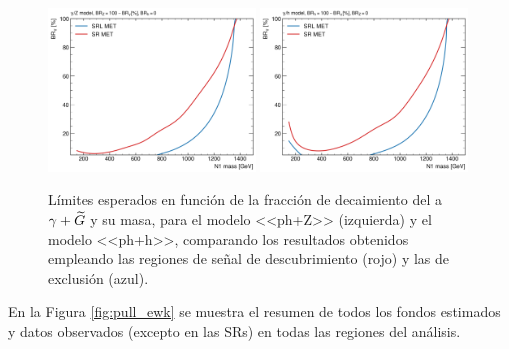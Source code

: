 \begin{figure}[ht!]
  \centering

    \includegraphics[width=0.49\textwidth]{images/analysis_EWK/plots_exp_excl_ewk/expected_limit_mass_vs_BR_yZ_cmp_SRL_vs_SR.png}
    \includegraphics[width=0.49\textwidth]{images/analysis_EWK/plots_exp_excl_ewk/expected_limit_mass_vs_BR_yh_cmp_SRL_vs_SR.png}

    \caption{Límites esperados en función de la fracción de decaimiento del \ninoone a $\gamma+\widetilde{G}$ y su masa, para el modelo <<ph+Z>> (izquierda) y el modelo <<ph+h>>, comparando los resultados obtenidos empleando las regiones de señal de descubrimiento (rojo) y las de exclusión (azul).}
    \label{fig:sre_ewk}

\end{figure}

En la Figura \ref{fig:pull_ewk} se muestra el resumen de todos los fondos estimados y datos observados (excepto en las SRs) en todas las regiones del análisis.



